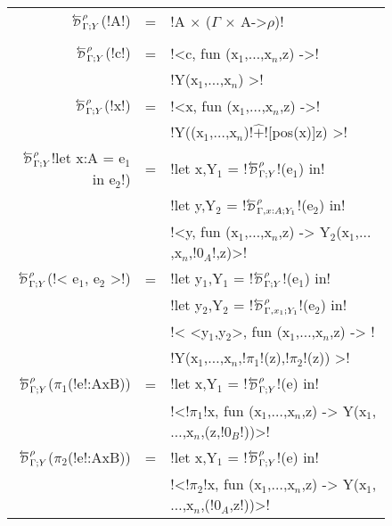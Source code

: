 \begin{figure*}[t]
    \small
    \begin{tabular}{|r c l|}
    \hline
        $\directD{\rho}{\Gamma}{Y}$(!A!) &=& !A $\times$ ($\Gamma$ $\times$ A->$\rho$)!\\ & & \\
        $\directD{\rho}{\Gamma}{Y}$(!c!) &=& 
            !<c, fun (x$_{1}$,$\ldots$,x$_n$,z) ->! \\
            && !Y(x$_{1}$,$\ldots$,x$_{n}$) >!\\
        $\directD{\rho}{\Gamma}{Y}$(!x!) &=& 
            !<x, fun (x$_{1}$,$\ldots$,x$_n$,z) ->! \\
            && !Y((x$_{1}$,$\ldots$,x$_n$)!$\widehat{+}$![pos(x)]z) >!\\
        $\directD{\rho}{\Gamma}{Y}$!let x:A = e$_{1}$ in e$_{2}$!) &=& 
            !let x,Y$_{1}$ = !$\directD{\rho}{\Gamma}{Y}$!(e$_{1}$) in! \\
            &&!let y,Y$_{2}$ = !$\directD{\rho}{\Gamma,x:A}{Y_1}$!(e$_{2}$) in!\\ 
            &&!<y, fun (x$_{1}$,$\ldots$,x$_n$,z) -> Y$_{2}$(x$_{1}$,$\ldots$,x$_n$,!$0_{A}$!,z)>!\\
        $\directD{\rho}{\Gamma}{Y}$(!< e$_{1}$, e$_{2}$ >!) &=&
            !let y$_{1}$,Y$_{1}$ = !$\directD{\rho}{\Gamma}{Y}$!(e$_{1}$) in! \\
            &&!let y$_{2}$,Y$_{2}$ = !$\directD{\rho}{\Gamma,x_1}{Y_1}$!(e$_{2}$) in!\\
            &&!< <y$_{1}$,y$_{2}$>, fun (x$_{1}$,$\ldots$,x$_n$,z) -> !\\
            &&!Y(x$_{1}$,$\ldots$,x$_n$,!$\pi_1$!(z),!$\pi_2$!(z)) >!\\ 
        $\directD{\rho}{\Gamma}{Y}$($\pi_1$(!e!:AxB)) &=&
            !let x,Y$_{1}$ = !$\directD{\rho}{\Gamma}{Y}$!(e) in! \\
            && !<!$\pi_1$!x, fun (x$_{1}$,$\ldots$,x$_n$,z) -> Y(x$_{1}$,$\ldots$,x$_n$,(z,!$0_B$!))>! \\
        $\directD{\rho}{\Gamma}{Y}$($\pi_2$(!e!:AxB)) &=&
            !let x,Y$_{1}$ = !$\directD{\rho}{\Gamma}{Y}$!(e) in! \\
            && !<!$\pi_2$!x, fun (x$_{1}$,$\ldots$,x$_n$,z) -> Y(x$_{1}$,$\ldots$,x$_n$,(!$0_A$,z!))>! \\

\end{tabular}
\end{figure*}

